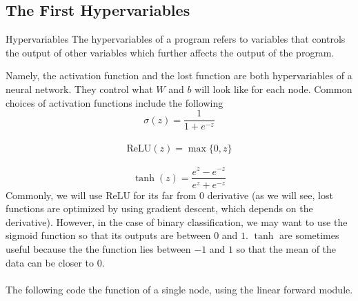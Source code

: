 \documentclass[a4paper]{article}
\begin{document}
\subsection{The First Hypervariables}
\begin{defn}{Hypervariables}{} The hypervariables of a program refers to variables that controls the output of other variables which further affects the output of the program. 
\end{defn}

Namely, the activation function and the lost function are both hypervariables of a neural network. They control what $W$ and $b$ will look like for each node. Common choices of activation functions include the following $$\sigma(z)=\frac{1}{1+e^{-z}}$$~$$\text{ReLU}(z)=\max\{0,z\}$$~$$\tanh(z)=\frac{e^z-e^{-z}}{e^z+e^{-z}}$$ Commonly, we will use $\text{ReLU}$ for its far from $0$ derivative (as we will see, lost functions are optimized by using gradient descent, which depends on the derivative). However, in the case of binary classification, we may want to use the sigmoid function so that its outputs are between $0$ and $1$. $\tanh$ are sometimes useful because the the function lies between $-1$ and $1$ so that the mean of the data can be closer to $0$. \\~\\

The following code the function of a single node, using the linear forward module. 
\end{document}
